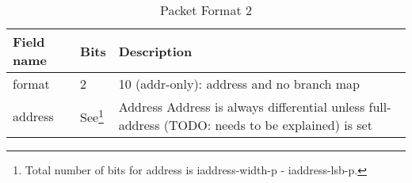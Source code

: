 \begin{table}[htp]
    \centering
    \caption{Packet Format 2}
    \label{tab:te_inst2}
    \begin{tabulary}{\textwidth}{|l|l|p{100mm}|}
        \hline
        {\bf Field name} & {\bf Bits} & {\bf Description} \\
        \hline
        format	& 2	& 10 (addr-only): address and no branch map\\
        \hline
        address & See\footnote {\label{addressbitslsbmsb}Total number of bits for address is iaddress-width-p - iaddress-lsb-p.} & Address \newline
        Address is always differential unless full-address (TODO: needs to be explained) is set\\ 
        \hline
    \end{tabulary}
\end{table}

